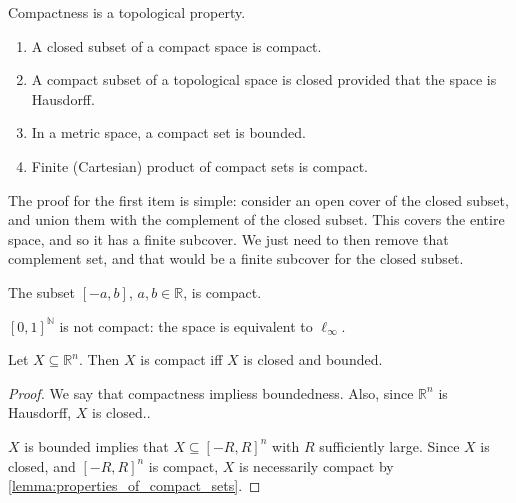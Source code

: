 \documentclass[notoc,notitlepage]{tufte-book}
\begin{document}
\begin{note}
  Compactness is a topological property.
\end{note}

\begin{lemma}\label{lemma:properties_of_compact_sets}
  \begin{enumerate}
    \item A closed subset of a compact space is compact.
    \item A compact subset of a topological space is closed provided that the
      space is Hausdorff.
    \item In a metric space, a compact set is bounded.
    \item Finite (Cartesian) product of compact sets is compact.
  \end{enumerate}
\end{lemma}

The proof for the first item is simple: consider an open cover of the closed subset,
and union them with the complement of the closed subset. This covers the entire space,
and so it has a finite subcover. We just need to then remove that complement set, and
that would be a finite subcover for the closed subset.

\begin{eg}
  The subset $[-a, b]$, $a, b \in \mathbb{R}$, is compact.
\end{eg}

\begin{eg}
  $[0, 1]^{\mathbb{N}}$ is not compact: the space is equivalent to $\ell_\infty$.
\end{eg}

\begin{thm}\label{thm:heine_borel}
  Let $X \subseteq \mathbb{R}^n$. Then $X$ is compact iff $X$ is closed and bounded.
\end{thm}

\begin{proof}
  \hlbnoted{$(\implies)$} We say that compactness impliess boundedness. Also, since
  $\mathbb{R}^n$ is Hausdorff, $X$ is closed..

  \noindent
  \hlbnoted{$(\impliedby)$} $X$ is bounded implies that $X \subseteq [-R, R]^n$ with $R$
  sufficiently large. Since $X$ is closed, and $[-R, R]^n$ is compact, $X$ is necessarily
  compact by \cref{lemma:properties_of_compact_sets}.
\end{proof}
\end{document}
